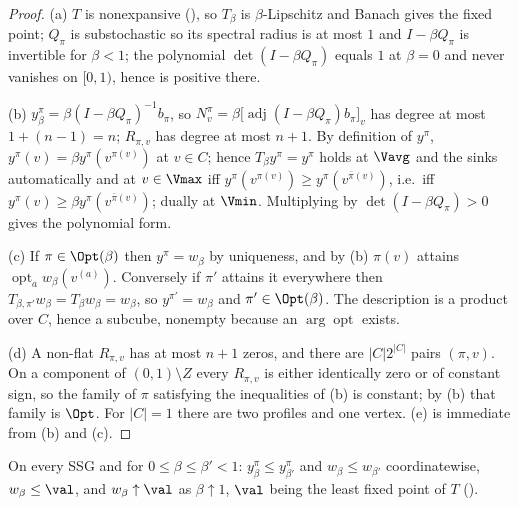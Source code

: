 \begin{proof}
(a) $T$ is nonexpansive (), so $T_\beta$ is $\beta$-Lipschitz
and Banach gives the fixed point; $Q_\pi$ is substochastic so its spectral
radius is at most $1$ and $I-\beta Q_\pi$ is invertible for $\beta<1$; the
polynomial $\det(I-\beta Q_\pi)$ equals $1$ at $\beta=0$ and never vanishes on
$[0,1)$, hence is positive there.

(b) $y^{\pi}_\beta=\beta(I-\beta Q_\pi)^{-1}b_\pi$, so
$N^{\pi}_v=\beta\bigl[\operatorname{adj}(I-\beta Q_\pi)b_\pi\bigr]_v$ has degree
at most $1+(n-1)=n$; $R_{\pi,v}$ has degree at most $n+1$. By definition of
$y^{\pi}$, $y^{\pi}(v)=\beta y^{\pi}(v^{\pi(v)})$ at $v\in C$; hence
$T_\beta y^{\pi}=y^{\pi}$ holds at $\Vavg$ and the sinks automatically and at
$v\in\Vmax$ iff $y^{\pi}(v^{\pi(v)})\ge y^{\pi}(v^{\bar\pi(v)})$, i.e.\ iff
$y^{\pi}(v)\ge\beta y^{\pi}(v^{\bar\pi(v)})$; dually at $\Vmin$. Multiplying by
$\det(I-\beta Q_\pi)>0$ gives the polynomial form.

(c) If $\pi\in\Opt(\beta)$ then $y^{\pi}=w_\beta$ by uniqueness, and by (b)
$\pi(v)$ attains $\operatorname{opt}_aw_\beta(v^{(a)})$. Conversely if $\pi'$
attains it everywhere then $T_{\beta,\pi'}w_\beta=T_\beta w_\beta=w_\beta$, so
$y^{\pi'}=w_\beta$ and $\pi'\in\Opt(\beta)$. The description is a product over
$C$, hence a subcube, nonempty because an $\arg\!\operatorname{opt}$ exists.

(d) A non-flat $R_{\pi,v}$ has at most $n+1$ zeros, and there are $|C|2^{|C|}$
pairs $(\pi,v)$. On a component of $(0,1)\setminus Z$ every $R_{\pi,v}$ is
either identically zero or of constant sign, so the family of $\pi$ satisfying
the inequalities of (b) is constant; by (b) that family is $\Opt$. For $|C|=1$
there are two profiles and one vertex. (e) is immediate from (b) and (c).
\end{proof}

\begin{proposition}\label{pp:monotone}
On every SSG and for $0\le\beta\le\beta'<1$: $y^{\pi}_\beta\le y^{\pi}_{\beta'}$
and $w_\beta\le w_{\beta'}$ coordinatewise, $w_\beta\le\val$, and
$w_\beta\uparrow\val$ as $\beta\uparrow1$, $\val$ being the least fixed point of
$T$ ().
\end{proposition}

